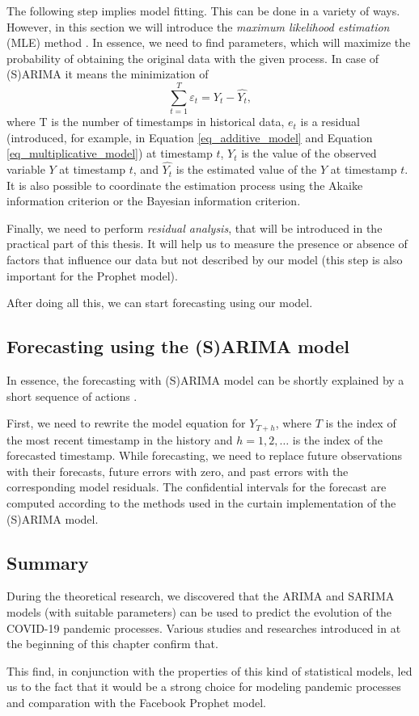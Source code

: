 The following step implies model fitting. This can be done in a variety of ways. However, in this section we will introduce the \textit{maximum likelihood estimation} (MLE) method \cite{Hyndman2018}. In essence, we need to find parameters, which will maximize the probability of obtaining the original data with the given process. In case of (S)ARIMA it means the minimization of
\begin{equation}
    \sum_{t=1}^{T} \varepsilon_t = Y_t - \hat{Y_t},
\end{equation}
where T is the number of timestamps in historical data, $e_t$ is a residual (introduced, for example, in Equation \ref{eq_additive_model} and Equation \ref{eq_multiplicative_model}) at timestamp $t$, $Y_t$ is the value of the observed variable $Y$ at timestamp $t$, and $\hat{Y_t}$ is the estimated value of the $Y$ at timestamp $t$. It is also possible to coordinate the estimation process using the Akaike information criterion or the Bayesian information criterion.

Finally, we need to perform \textit{residual analysis}, that will be introduced in the practical part of this thesis. It will help us to measure the presence or absence of factors that influence our data but not described by our model (this step is also important for the Prophet model). 

After doing all this, we can start forecasting using our model.

\subsection{Forecasting using the (S)ARIMA model}

In essence, the forecasting with (S)ARIMA model can be shortly explained by a short sequence of actions \cite{Hyndman2018}. 

First, we need to rewrite the model equation for $Y_{T+h}$, where $T$ is the index of the most recent timestamp in the history and $h = 1, 2, \ldots$ is the index of the forecasted timestamp. While forecasting, we need to replace future observations with their forecasts, future errors with zero, and past errors with the corresponding model residuals. The confidential intervals for the forecast are computed according to the methods used in the curtain implementation of the (S)ARIMA model.

\subsection{Summary}

During the theoretical research, we discovered that the ARIMA and SARIMA models (with suitable parameters) can be used to predict the evolution of the COVID-19 pandemic processes. Various studies and researches introduced in at the beginning of this chapter confirm that.

This find, in conjunction with the properties of this kind of statistical models, led us to the fact that it would be a strong choice for modeling pandemic processes and comparation with the Facebook Prophet model.